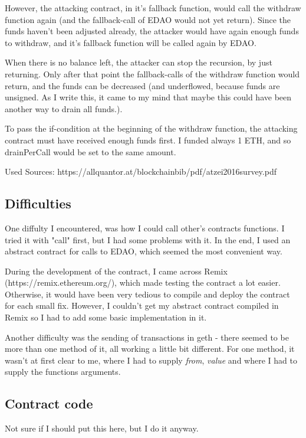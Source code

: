 \documentclass[12pt,a4paper]{article}
\begin{document}
However, the attacking contract, in it's fallback function, would call the withdraw function again (and the fallback-call of EDAO would not yet return).
Since the funds haven't been adjusted already, the attacker would have again enough funds to withdraw, and it's fallback function will be called again by EDAO.

When there is no balance left, the attacker can stop the recursion, by just returning.
Only after that point the fallback-calls of the withdraw function would return, and the funds can be decreased
(and underflowed, because funds are unsigned. As I write this, it came to my mind that maybe this could have been another way to drain all funds.).

To pass the if-condition at the beginning of the withdraw function, the attacking contract must have received enough funds first.
I funded always 1 ETH, and so drainPerCall would be set to the same amount.

Used Sources:
https://allquantor.at/blockchainbib/pdf/atzei2016survey.pdf

\subsection*{Difficulties}
One diffulty I encountered, was how I could call other's contracts functions. I tried it with "call" first, but I had some problems with it.
In the end, I used an abstract contract for calls to EDAO, which seemed the most convenient way.

During the development of the contract, I came across Remix (https://remix.ethereum.org/), which made testing the contract a lot easier.
Otherwise, it would have been very tedious to compile and deploy the contract for each small fix.
However, I couldn't get my abstract contract compiled in Remix so I had to add some basic implementation in it.

Another difficulty was the sending of transactions in geth - there seemed to be more than one method of it, all working a little bit different.
For one method, it wasn't at first clear to me, where I had to supply \textit{from}, \textit{value} and where I had to supply the functions arguments.

\pagebreak

\subsection*{Contract code}
Not sure if I should put this here, but I do it anyway.


\end{document}
